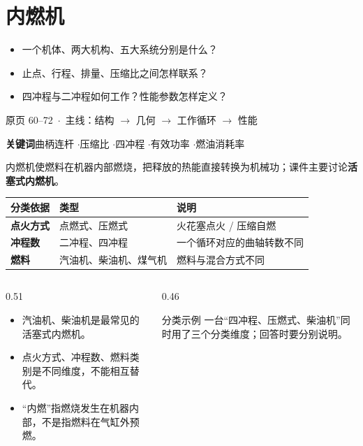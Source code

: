\section{内燃机}

\begin{frame}[t,shrink]{}
{\begin{itemize}
  \item 一个机体、两大机构、五大系统分别是什么？
  \item 止点、行程、排量、压缩比之间怎样联系？
  \item 四冲程与二冲程如何工作？性能参数怎样定义？
\end{itemize}}
{原页 60--72 \,$\cdot$\, 主线：结构 $\rightarrow$ 几何 $\rightarrow$ 工作循环 $\rightarrow$ 性能}
\vspace{3mm}
\begin{center}
\small
\textbf{关键词}\quad 曲柄连杆 \enspace$\cdot$\enspace 压缩比 \enspace$\cdot$\enspace 四冲程 \enspace$\cdot$\enspace 有效功率 \enspace$\cdot$\enspace 燃油消耗率
\end{center}
\end{frame}

\begin{frame}[t,shrink]{}
内燃机使燃料在机器内部燃烧，把释放的热能直接转换为机械功；课件主要讨论\textbf{活塞式内燃机}。
\begin{smalltab}
\begin{tabularx}{\linewidth}{@{}>{\bfseries}p{25mm}p{40mm}X@{}}
  \toprule
  分类依据 & 类型 & 说明\\
  \midrule
  点火方式 & 点燃式、压燃式 & 火花塞点火 / 压缩自燃\\
  冲程数 & 二冲程、四冲程 & 一个循环对应的曲轴转数不同\\
  燃料 & 汽油机、柴油机、煤气机 & 燃料与混合方式不同\\
  \bottomrule
\end{tabularx}
\end{smalltab}
\begin{columns}[T,onlytextwidth]
\begin{column}{0.51\textwidth}
  \begin{itemize}
    \item 汽油机、柴油机是最常见的活塞式内燃机。
    \item 点火方式、冲程数、燃料类别是不同维度，不能相互替代。
    \item “内燃”指燃烧发生在机器内部，不是指燃料在气缸外预燃。
  \end{itemize}
\end{column}
\begin{column}{0.46\textwidth}
  \begin{keybox}{分类示例}
  \small 一台“四冲程、压燃式、柴油机”同时用了三个分类维度；回答时要分别说明。
  \end{keybox}
\end{column}
\end{columns}
\end{frame}

